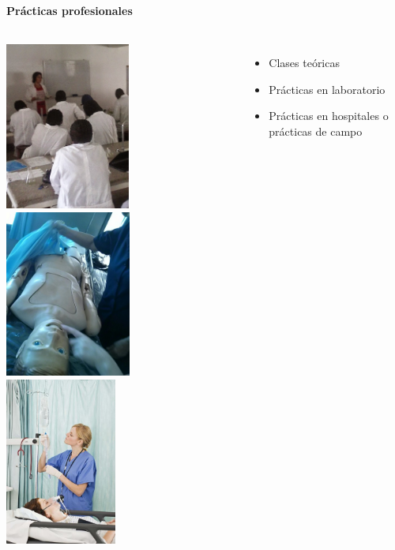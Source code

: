 \begin{frame}
\frametitle{\pagetitle}
\framesubtitle{Prácticas profesionales}

\begin{columns}
 \hspace{0.5cm}
\begin{overprint}
	  \includegraphics[width=\textwidth, height=5.5cm]{imagenes/clases_teoricas.png} 
     \includegraphics[width=\textwidth, height=5.5cm]{../problema/iab_sala_3.jpg} 
     \includegraphics[width=\textwidth, height=5.5cm]{imagenes/practica_campo.jpg} 
   
\end{overprint}
 \hspace{0.5cm}
\begin{itemize}[<+->]
	\item Clases teóricas
	\item Prácticas en laboratorio
	\item Prácticas en hospitales o prácticas de campo
\end{itemize}
\end{columns}

\end{frame}

